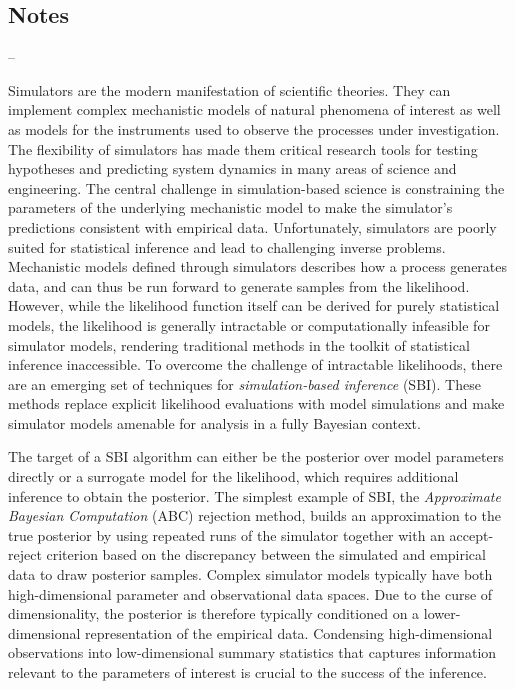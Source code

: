 \subsection*{Notes}



--

Simulators are the modern manifestation of scientific theories. They can implement complex mechanistic models of natural phenomena of interest as well as models for the instruments used to observe the processes under investigation. The flexibility of simulators has made them critical research tools for testing hypotheses and predicting system dynamics in many areas of science and engineering. The central challenge in simulation-based science is constraining the parameters of the underlying mechanistic model to make the simulator's predictions consistent with empirical data. Unfortunately, simulators are poorly suited for statistical inference and lead to challenging inverse problems. Mechanistic models defined through simulators describes how a process generates data, and can thus be run forward to generate samples from the likelihood. However, while the likelihood function itself can be derived for purely statistical models, the likelihood is generally intractable or computationally infeasible for simulator models, rendering traditional methods in the toolkit of statistical inference inaccessible. To overcome the challenge of intractable likelihoods, there are an emerging set of techniques for \textit{simulation-based inference} (SBI). These methods replace explicit likelihood evaluations with model simulations and make simulator models amenable for analysis in a fully Bayesian context.

The target of a SBI algorithm can either be the posterior over model parameters directly or a surrogate model for the likelihood, which requires additional inference to obtain the posterior. The simplest example of SBI, the \textit{Approximate Bayesian Computation} (ABC) rejection method, builds an approximation to the true posterior by using repeated runs of the simulator together with an accept-reject criterion based on the discrepancy between the simulated and empirical data to draw posterior samples. Complex simulator models typically have both high-dimensional parameter and observational data spaces. Due to the curse of dimensionality, the posterior is therefore typically conditioned on a lower-dimensional representation of the empirical data. Condensing high-dimensional observations into low-dimensional summary statistics that captures information relevant to the parameters of interest is crucial to the success of the inference.

